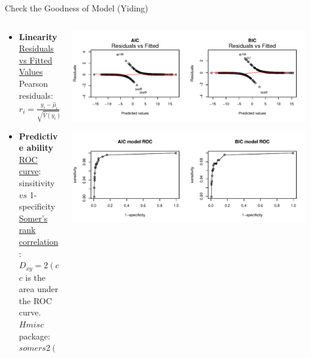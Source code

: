 \documentclass[table]{beamer}\usepackage[]{graphicx}\usepackage[]{color}
\makeatletter
\def\maxwidth{ %
  \ifdim\Gin@nat@width>\linewidth
    \linewidth
  \else
    \Gin@nat@width
  \fi
}
\newenvironment{knitrout}{}{} %
\makeatother
\begin{document}
\begin{frame}{Check the Goodness of Model (Yiding)}
\begin{columns}[t]
\begin{column}[t]{5cm}
{\fontsize{0.3cm}{1em}\selectfont
\begin{itemize}
\item \textbf{Linearity}\\
\underline{Residuals vs Fitted Values}\\
Pearson residuals:\\
$r_i=\frac{y_i-\hat{\mu}_i}{\sqrt{\hat{V}(y_i)}}=\frac{y_i-n_i\hat{\pi}_i}{\sqrt{n_i\hat{\pi}_i(1-\hat{\pi}_i)}}$\\[3\baselineskip]

\item{\textbf{Predictive ability}}\\
\underline{ROC curve}:\\
sinsitivity $vs$ 1-specificity\\
\underline{Somer's rank correlation}:\\
$D_{xy}=2(c-0.5)$\\
$c$ is the area under the ROC curve.\\[1\baselineskip]
$Hmisc$ package: $somers2()$
\end{itemize}

}
\end{column}

\begin{column}[t]{7cm}
\begin{knitrout}
\color{fgcolor}
\includegraphics[width=\maxwidth]{figure/AIC_BIC_RESIDUALS} 

\end{knitrout}


\begin{knitrout}
\color{fgcolor}
\includegraphics[width=\maxwidth]{figure/prdict_ability} 


\end{knitrout}
\end{column}
\end{columns}
\end{frame}
\end{document}
